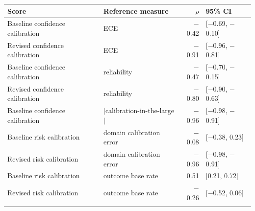\footnotesize
\begin{tabular}{@{}L{4.0cm}L{3.6cm}rl@{}}
\toprule
Score & Reference measure & $\rho$ & 95\% CI\\
\midrule
Baseline confidence calibration & ECE & $-$0.42 & [$-$0.69, $-$0.10]\\
Revised confidence calibration & ECE & $-$0.91 & [$-$0.96, $-$0.81]\\
Baseline confidence calibration & reliability & $-$0.47 & [$-$0.70, $-$0.15]\\
Revised confidence calibration & reliability & $-$0.80 & [$-$0.90, $-$0.63]\\
Baseline confidence calibration & $|$calibration-in-the-large$|$ & $-$0.96 & [$-$0.98, $-$0.91]\\
Baseline risk calibration & domain calibration error & $-$0.08 & [$-$0.38, 0.23]\\
Revised risk calibration & domain calibration error & $-$0.96 & [$-$0.98, $-$0.91]\\
Baseline risk calibration & outcome base rate & 0.51 & [0.21, 0.72]\\
Revised risk calibration & outcome base rate & $-$0.26 & [$-$0.52, 0.06]\\
\botrule
\end{tabular}
